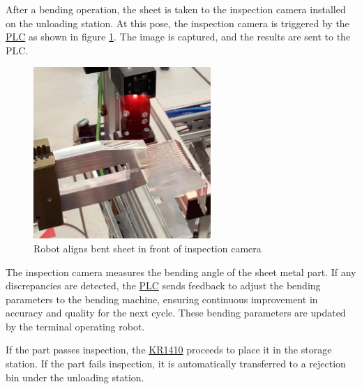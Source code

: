 
After a bending operation, the sheet is taken to the inspection camera installed on the unloading station.
At this pose, the inspection camera is triggered by the \hyperref[acro:PLC]{PLC} as shown in figure \ref{fig:inspection-setup}. The image is captured, and the results are sent to the PLC.

\begin{figure}[h]
    \centering
    \includegraphics[width=0.6\textwidth]{figures/inspection-setup.png}
    \caption{Robot aligns bent sheet in front of inspection camera}
    \label{fig:inspection-setup}
\end{figure}

The inspection camera measures the bending angle of the sheet metal part. If any discrepancies are detected, the \hyperref[acro:PLC]{PLC} sends feedback to adjust the bending parameters to the bending machine, ensuring continuous improvement in accuracy and quality for the next cycle. These bending parameters are updated by the terminal operating robot.

If the part passes inspection, the \hyperref[acro:KR]{KR1410} proceeds to place it in the storage station. If the part fails inspection, it is automatically transferred to a rejection bin under the unloading station.